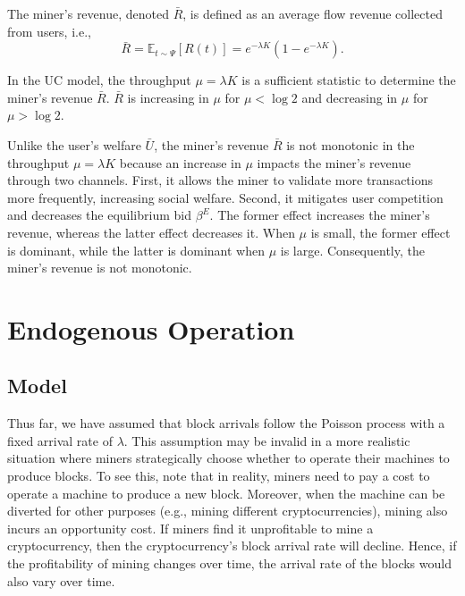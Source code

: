 \documentclass[12pt, letterpaper]{article}
\begin{document}
The miner's revenue, denoted $\bar{R}$, is defined as an average flow revenue collected from users, i.e.,
\begin{equation}
    \bar{R} = \mathbb{E}_{t \sim \Psi}[R(t)] = e^{-\lambda K} (1 - e^{-\lambda K}).
\end{equation}

\begin{prop}
    In the UC model, the throughput $\mu = \lambda K$ is a sufficient statistic to determine the miner's revenue $\bar{R}$. $\bar{R}$ is increasing in $\mu$ for $\mu < \log 2$ and decreasing in $\mu$ for $\mu > \log 2$.
\end{prop}

Unlike the user's welfare $\bar{U}$, the miner's revenue $\bar{R}$ is not monotonic in the throughput $\mu = \lambda K$ because an increase in $\mu $ impacts the miner's revenue through two channels. First, it allows the miner to validate more transactions more frequently, increasing social welfare. Second, it mitigates user competition and decreases the equilibrium bid $\beta^E$. The former effect increases the miner's revenue, whereas the latter effect decreases it. When $\mu$ is small, the former effect is dominant, while the latter is dominant when $\mu$ is large. Consequently, the miner's revenue is not monotonic.




\section{Endogenous Operation}\label{sec:endo_ope}

\subsection{Model}

Thus far, we have assumed that block arrivals follow the Poisson process with a fixed arrival rate of $\lambda$. This assumption may be invalid in a more realistic situation where miners strategically choose whether to operate their machines to produce blocks. To see this, note that in reality, miners need to pay a cost to operate a machine to produce a new block. Moreover, when the machine can be diverted for other purposes (e.g., mining different cryptocurrencies), mining also incurs an opportunity cost. If miners find it unprofitable to mine a cryptocurrency, then the cryptocurrency's block arrival rate will decline. Hence, if the profitability of mining changes over time, the arrival rate of the blocks would also vary over time.
\end{document}
